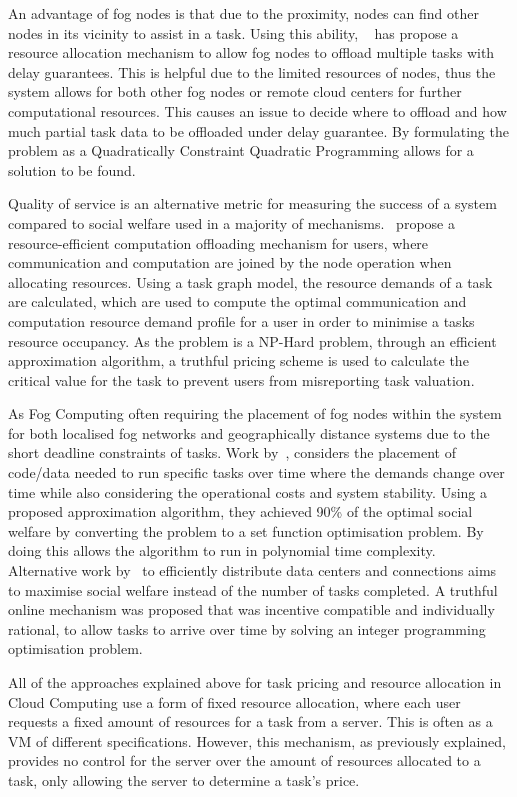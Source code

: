 An advantage of fog nodes is that due to the proximity, nodes can find other nodes in its vicinity to assist in a task.
Using this ability, ~\cite{8839780} has propose a resource allocation mechanism to allow fog nodes to offload multiple
tasks with delay guarantees. This is helpful due to the limited resources of nodes, thus the system allows for
both other fog nodes or remote cloud centers for further computational resources. This causes an issue to decide where
to offload and how much partial task data to be offloaded under delay guarantee. By formulating the problem as a
Quadratically Constraint Quadratic Programming allows for a solution to be found.

Quality of service is an alternative metric for measuring the success of a system compared to social welfare used in a
majority of mechanisms.~\cite{8379445} propose a resource-efficient computation offloading mechanism for users, where
communication and computation are joined by the node operation when allocating resources. Using a task graph model, the
resource demands of a task are calculated, which are used to compute the optimal communication and computation resource
demand profile for a user in order to minimise a tasks resource occupancy. As the problem is a NP-Hard problem, through an
efficient approximation algorithm, a truthful pricing scheme is used to calculate the critical value for the task to
prevent users from misreporting task valuation.

As Fog Computing often requiring the placement of fog nodes within the system for both localised fog networks and
geographically distance systems due to the short deadline constraints of tasks. Work by~\cite{vaji_infocom}, considers
the placement of code/data needed to run specific tasks over time where the demands change over time while also
considering the operational costs and system stability. Using a proposed approximation algorithm, they achieved 90\% of
the optimal social welfare by converting the problem to a set function optimisation problem. By doing this allows the
algorithm to run in polynomial time complexity. \\
Alternative work by~\cite{Bi2019} to efficiently distribute data centers and connections aims to maximise social
welfare instead of the number of tasks completed. A truthful online mechanism was proposed that was incentive compatible
and individually rational, to allow tasks to arrive over time by solving an integer programming optimisation problem.

All of the approaches explained above for task pricing and resource allocation in Cloud Computing use a form of fixed
resource allocation, where each user requests a fixed amount of resources for a task from a server. This is often as a
VM of different specifications. However, this mechanism, as previously explained, provides no control for the server
over the amount of resources allocated to a task, only allowing the server to determine a task's price.

